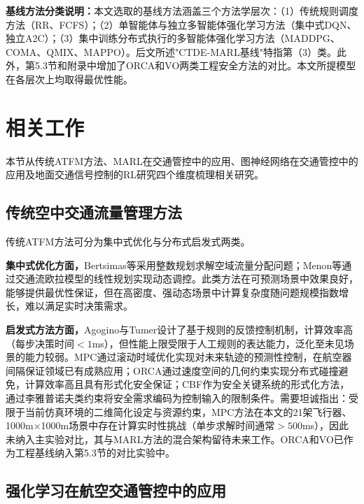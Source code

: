\documentclass[12pt,a4paper,UTF8]{ctexart}
\begin{document}
\textbf{基线方法分类说明：}本文选取的基线方法涵盖三个方法学层次：（1）传统规则调度方法（RR、FCFS）；（2）单智能体与独立多智能体强化学习方法（集中式DQN、独立A2C）；（3）集中训练分布式执行的多智能体强化学习方法（MADDPG、COMA、QMIX、MAPPO）。后文所述"CTDE-MARL基线"特指第（3）类。此外，第5.3节和附录中增加了ORCA和VO两类工程安全方法的对比。本文所提模型在各层次上均取得最优性能。

\section{相关工作}

本节从传统ATFM方法、MARL在交通管控中的应用、图神经网络在交通管控中的应用及地面交通信号控制的RL研究四个维度梳理相关研究。

\subsection{传统空中交通流量管理方法}

传统ATFM方法可分为集中式优化与分布式启发式两类。

\textbf{集中式优化方面，}Bertsimas等采用整数规划求解空域流量分配问题；Menon等通过交通流欧拉模型的线性规划实现动态调控\cite{ref31}。此类方法在可预测场景中效果良好，能够提供最优性保证，但在高密度、强动态场景中计算复杂度随问题规模指数增长，难以满足实时决策需求。

\textbf{启发式方法方面，}Agogino与Tumer设计了基于规则的反馈控制机制\cite{ref4}，计算效率高（每步决策时间$<1$ms），但性能上限受限于人工规则的表达能力，泛化至未见场景的能力较弱。MPC\cite{ref27}通过滚动时域优化实现对未来轨迹的预测性控制，在航空器间隔保证领域已有成熟应用；ORCA\cite{ref22}通过速度空间的几何约束实现分布式碰撞避免，计算效率高且具有形式化安全保证；CBF\cite{ref23}作为安全关键系统的形式化方法，通过李雅普诺夫类约束将安全需求编码为控制输入的限制条件。需要坦诚指出：受限于当前仿真环境的二维简化设定与资源约束，MPC方法在本文的21架飞行器、1000m$\times$1000m场景中存在计算实时性挑战（单步求解时间通常$>500$ms），因此未纳入主实验对比，其与MARL方法的混合架构留待未来工作。ORCA和VO已作为工程基线纳入第5.3节的对比实验中。

\subsection{强化学习在航空交通管控中的应用}
\end{document}

